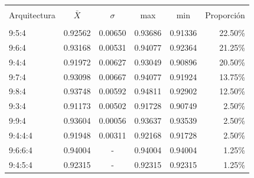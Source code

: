 \documentclass[spanish,a4paper,12pt,twoside]{report}
\begin{document}
\begin{center}
   \label{table}
  \begin{tabular}{l c c c c r}
    \hline \\ [-2ex]
    Arquitectura & $\bar{X}$ & $\sigma$ & max & min & Proporción \\ [0.5ex]
    \hline \\ [-1ex]
    9:5:4 & 0.92562 & 0.00650 & 0.93686 & 0.91336 & 22.50\% \\
    9:6:4 & 0.93168 & 0.00531 & 0.94077 & 0.92364 & 21.25\% \\
    9:4:4 & 0.91972 & 0.00627 & 0.93049 & 0.90896 & 20.50\% \\
    9:7:4 & 0.93098 & 0.00667 & 0.94077 & 0.91924 & 13.75\% \\
    9:8:4 & 0.93748 & 0.00592 & 0.94811 & 0.92902 & 12.50\% \\
    9:3:4 & 0.91173 & 0.00502 & 0.91728 & 0.90749 & 2.50\% \\
    9:9:4 & 0.93604 & 0.00056 & 0.93637 & 0.93539 & 2.50\% \\
    9:4:4:4 & 0.91948 & 0.00311 & 0.92168 & 0.91728 & 2.50\% \\
    9:6:6:4 & 0.94004 & - & 0.94004 & 0.94004 & 1.25\% \\
    9:4:5:4 & 0.92315 & - & 0.92315 & 0.92315 & 1.25\% \\[1ex]
    \hline
  \end{tabular}
\end{center} \par
  
  \newpage\cleardoublepage
  
\end{document}
